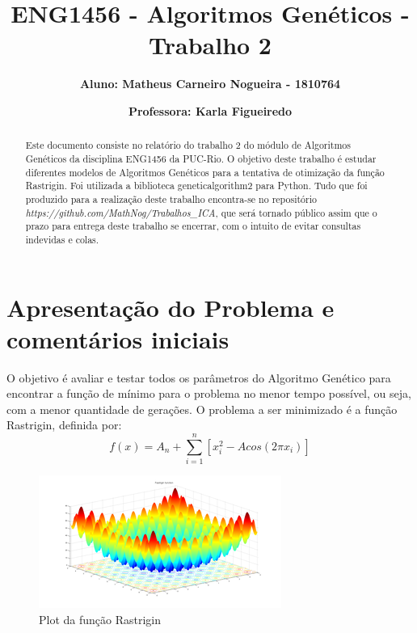 \documentclass[12pt]{article}
\title{\textbf{ENG1456 - Algoritmos Genéticos - Trabalho 2}}
\author{\textbf{Aluno: Matheus Carneiro Nogueira - 1810764}}
\affil{}
\author{\textbf{Professora: Karla Figueiredo}}
\affil{}
\date{}
\begin{document}
	\maketitle
	
	
\begin{abstract}
	Este documento consiste no relatório do trabalho 2 do módulo de Algoritmos Genéticos da disciplina ENG1456 da PUC-Rio. O objetivo deste trabalho é estudar diferentes modelos de Algoritmos Genéticos para a tentativa de otimização da função Rastrigin. Foi utilizada a biblioteca geneticalgorithm2 para Python. Tudo que foi produzido para a realização deste trabalho encontra-se no repositório \textit{https://github.com/MathNog/Trabalhos\_ICA}, que será tornado público assim que o prazo para entrega deste trabalho se encerrar, com o intuito de evitar consultas indevidas e colas.
\end{abstract}
	
\section{Apresentação do Problema e comentários iniciais}

O objetivo é avaliar e testar todos os parâmetros do Algoritmo Genético para encontrar a função de mínimo para o problema no menor tempo possível, ou seja, com a menor quantidade de gerações. O problema a ser minimizado é a função Rastrigin, definida por:
\begin{equation*}
	f(x)=A_n+\sum_{i=1}^{n}[x_i^2-Acos(2\pi x_i)]
\end{equation*}

\begin{figure}[H]
	\centering
	\includegraphics[width=0.9\linewidth]{Imagens/Rastrigin_function}
	\caption{Plot da função Rastrigin}
	\label{fig:rastriginfunction}
\end{figure}
\end{document}
